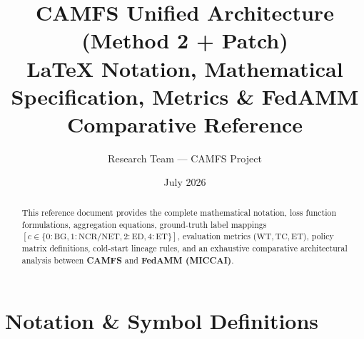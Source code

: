 \documentclass[11pt,a4paper]{article}
\title{\textbf{CAMFS Unified Architecture (Method 2 + Patch)}\\LaTeX Notation, Mathematical Specification, Metrics \& FedAMM Comparative Reference}
\author{Research Team --- CAMFS Project}
\date{July 2026}
\begin{document}
\maketitle

\begin{abstract}
This reference document provides the complete mathematical notation, loss function formulations, aggregation equations, ground-truth label mappings $[c \in \{0:\text{BG}, 1:\text{NCR/NET}, 2:\text{ED}, 4:\text{ET}\}]$, evaluation metrics ($\text{WT}, \text{TC}, \text{ET}$), policy matrix definitions, cold-start lineage rules, and an exhaustive comparative architectural analysis between \textbf{CAMFS} and \textbf{FedAMM (MICCAI)}.
\end{abstract}

\tableofcontents
\newpage

\section{Notation \& Symbol Definitions}
\end{document}
